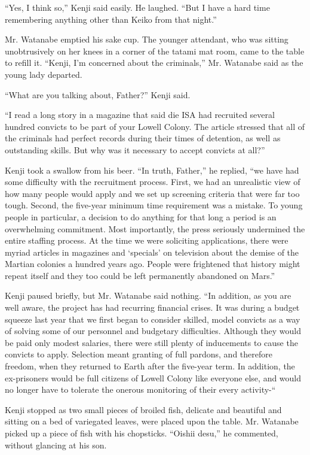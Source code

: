 \documentclass[]{article}
\begin{document}
{“Yes, I think so,” Kenji said easily.  He laughed.  “But I have a hard time remembering anything other than Keiko from that night.”

Mr.  Watanabe emptied his sake cup.  The younger attendant, who was sitting unobtrusively on her knees in a corner of the tatami mat room, came to the table to refill it.  “Kenji, I’m concerned about the criminals,” Mr.  Watanabe said as the young lady departed.

“What are you talking about, Father?” Kenji said.

“I read a long story in a magazine that said die ISA had recruited several hundred convicts to be part of your Lowell Colony.  The article stressed that all of the criminals had perfect records during their times of detention, as well as outstanding skills.  But why was it necessary to accept convicts at all?”

Kenji took a swallow from his beer.  “In truth, Father,” he replied, “we have had some difficulty with the recruitment process.  First, we had an unrealistic view of how many people would apply and we set up screening criteria that were far too tough.  Second, the five-year minimum time requirement was a mistake.  To young people in particular, a decision to do anything for that long a period is an overwhelming commitment.  Most importantly, the press seriously undermined the entire staffing process.  At the time we were soliciting applications, there were myriad articles in magazines and ‘specials’ on television about the demise of the Martian colonies a hundred years ago.  People were frightened that history might repeat itself and they too could be left permanently abandoned on Mars.”

Kenji paused briefly, but Mr.  Watanabe said nothing.  “In addition, as you are well aware, the project has had recurring financial crises.  It was during a budget squeeze last year that we first began to consider skilled, model convicts as a way of solving some of our personnel and budgetary difficulties.  Although they would be paid only modest salaries, there were still plenty of inducements to cause the convicts to apply.  Selection meant granting of full pardons, and therefore freedom, when they returned to Earth after the five-year term.  In addition, the ex-prisoners would be full citizens of Lowell Colony like everyone else, and would no longer have to tolerate the onerous monitoring of their every activity-“

Kenji stopped as two small pieces of broiled fish, delicate and beautiful and sitting on a bed of variegated leaves, were placed upon the table.  Mr.  Watanabe picked up a piece of fish with his chopsticks.  “Oishii desu,” he commented, without glancing at his son.

}
\end{document}
